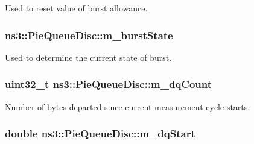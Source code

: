 Used to reset value of burst allowance. 

\subsubsection[{\texorpdfstring{m\+\_\+burst\+State}{m_burstState}}]{ ns3\+::\+Pie\+Queue\+Disc\+::m\+\_\+burst\+State\hspace{0.3cm}{\ttfamily [private]}}\hypertarget{classns3_1_1PieQueueDisc_a5da0c5c78affc315cab73ba4e41f0482}{}\label{classns3_1_1PieQueueDisc_a5da0c5c78affc315cab73ba4e41f0482}


Used to determine the current state of burst. 

\subsubsection[{\texorpdfstring{m\+\_\+dq\+Count}{m_dqCount}}]{\setlength{\rightskip}{0pt plus 5cm}uint32\+\_\+t ns3\+::\+Pie\+Queue\+Disc\+::m\+\_\+dq\+Count\hspace{0.3cm}{\ttfamily [private]}}\hypertarget{classns3_1_1PieQueueDisc_af0dc5330370bdc0013d694572fd08809}{}\label{classns3_1_1PieQueueDisc_af0dc5330370bdc0013d694572fd08809}


Number of bytes departed since current measurement cycle starts. 

\subsubsection[{\texorpdfstring{m\+\_\+dq\+Start}{m_dqStart}}]{\setlength{\rightskip}{0pt plus 5cm}double ns3\+::\+Pie\+Queue\+Disc\+::m\+\_\+dq\+Start\hspace{0.3cm}{\ttfamily [private]}}\hypertarget{classns3_1_1PieQueueDisc_a9d3eecd9c565536a646c87db0853b298}{}\label{classns3_1_1PieQueueDisc_a9d3eecd9c565536a646c87db0853b298}


